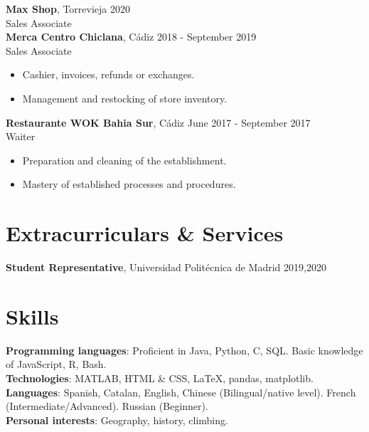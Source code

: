 \documentclass[11pt,a4paper]{article}
\begin{document}
\noindent
\textbf{Max Shop}, Torrevieja \hfill 2020\\
\hspace{10pt}Sales Associate\\

\noindent
\textbf{Merca Centro Chiclana}, Cádiz \hfill 2018 - September 2019\\
\hspace{10pt}Sales Associate 
    \begin{itemize}[label=-,itemsep=0pt]
        \item Cashier, invoices, refunds or exchanges.
        \item Management and restocking of store inventory.
    \end{itemize}

\noindent
\textbf{Restaurante WOK Bahia Sur}, Cádiz \hfill June 2017 - September 2017\\
\hspace{10pt}Waiter 
    \begin{itemize}[label=-,itemsep=0pt]
        \item Preparation and cleaning of the establishment.
        \item Mastery of established processes and procedures.
    \end{itemize}


\section*{Extracurriculars \& Services}
\textbf{Student Representative}, Universidad Politécnica de Madrid \hfill 2019,2020


\section*{Skills}
\textbf{Programming languages}: Proficient in Java, Python, C, SQL. Basic knowledge of JavaScript, R, Bash.\\[2pt]
\textbf{Technologies}: MATLAB, HTML \& CSS, \LaTeX, pandas, matplotlib.\\[2pt]
\textbf{Languages}: Spanish, Catalan, English, Chinese (Bilingual/native level). French (Intermediate/Advanced). Russian (Beginner).\\[2pt]
\textbf{Personal interests}: Geography, history, climbing.\\[5pt]
\end{document}
